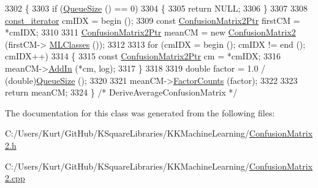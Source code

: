 \begin{DoxyCode}
3302 \{
3303   \textcolor{keywordflow}{if}  (\hyperlink{class_k_k_b_1_1_k_k_queue_a1dab601f75ee6a65d97f02bddf71c40d}{QueueSize} () == 0)
3304   \{
3305     \textcolor{keywordflow}{return} NULL;
3306   \}
3307 
3308   \hyperlink{class_k_k_b_1_1_k_k_queue_aeb057c9c010446f46f57c1e355f981f1}{const\_iterator}  cmIDX = begin ();
3309   \textcolor{keyword}{const} \hyperlink{class_k_k_m_l_l_1_1_confusion_matrix2}{ConfusionMatrix2Ptr}  firstCM = *cmIDX;
3310 
3311   \hyperlink{class_k_k_m_l_l_1_1_confusion_matrix2}{ConfusionMatrix2Ptr}  meanCM = \textcolor{keyword}{new} \hyperlink{class_k_k_m_l_l_1_1_confusion_matrix2}{ConfusionMatrix2} (firstCM->
      \hyperlink{class_k_k_m_l_l_1_1_confusion_matrix2_a3ffbf4a67a233073c85772d5e70b3a82}{MLClasses} ());
3312 
3313   \textcolor{keywordflow}{for}  (cmIDX = begin ();  cmIDX != end ();  cmIDX++)
3314   \{
3315     \textcolor{keyword}{const} \hyperlink{class_k_k_m_l_l_1_1_confusion_matrix2}{ConfusionMatrix2Ptr}  cm = *cmIDX;
3316     meanCM->\hyperlink{class_k_k_m_l_l_1_1_confusion_matrix2_a0c1a6eba13b1faa33aa922a46dfe0e21}{AddIn} (*cm, log); 
3317   \}
3318 
3319   \textcolor{keywordtype}{double}  factor = 1.0 / (double)\hyperlink{class_k_k_b_1_1_k_k_queue_a1dab601f75ee6a65d97f02bddf71c40d}{QueueSize} ();
3320 
3321   meanCM->\hyperlink{class_k_k_m_l_l_1_1_confusion_matrix2_ac4bdf6a0bea12fd748dc0d05e1844f29}{FactorCounts} (factor);
3322 
3323   \textcolor{keywordflow}{return}  meanCM;
3324 \}  \textcolor{comment}{/* DeriveAverageConfusionMatrix */}
\end{DoxyCode}


The documentation for this class was generated from the following files\+:\begin{DoxyCompactItemize}
\item 
C\+:/\+Users/\+Kurt/\+Git\+Hub/\+K\+Square\+Libraries/\+K\+K\+Machine\+Learning/\hyperlink{_confusion_matrix2_8h}{Confusion\+Matrix2.\+h}\item 
C\+:/\+Users/\+Kurt/\+Git\+Hub/\+K\+Square\+Libraries/\+K\+K\+Machine\+Learning/\hyperlink{_confusion_matrix2_8cpp}{Confusion\+Matrix2.\+cpp}\end{DoxyCompactItemize}
